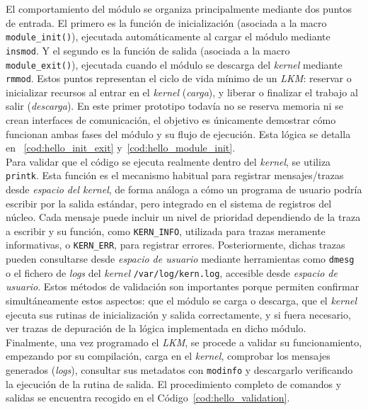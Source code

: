 El comportamiento del módulo se organiza principalmente mediante dos puntos de entrada.
El primero es la función de inicialización (asociada a la macro \texttt{module\_init()}), ejecutada automáticamente al cargar el módulo mediante \texttt{insmod}.
Y el segundo es la función de salida (asociada a la macro \texttt{module\_exit()}), ejecutada cuando el módulo se descarga del \textit{kernel} mediante \texttt{rmmod}.
Estos puntos representan el ciclo de vida mínimo de un \textit{LKM}: reservar o inicializar recursos al entrar en el \textit{kernel} (\textit{carga}), y liberar o finalizar el trabajo al salir (\textit{descarga}).
En este primer prototipo todavía no se reserva memoria ni se crean interfaces de comunicación, el objetivo es únicamente demostrar cómo funcionan ambas fases del módulo y su flujo de ejecución.
Esta lógica se detalla en ~\ref{cod:hello_init_exit} y~\ref{cod:hello_module_init}.\\

Para validar que el código se ejecuta realmente dentro del \textit{kernel}, se utiliza \texttt{printk}.
Esta función es el mecanismo habitual para registrar mensajes/trazas desde \textit{espacio del kernel}, de forma análoga a cómo un programa de usuario podría escribir por la salida estándar, pero integrado en el sistema de registros del núcleo.
Cada mensaje puede incluir un nivel de prioridad dependiendo de la traza a escribir y su función, como \texttt{KERN\_INFO}, utilizada para trazas meramente informativas, o \texttt{KERN\_ERR}, para registrar errores.
Posteriormente, dichas trazas pueden consultarse desde \textit{espacio de usuario} mediante herramientas como \texttt{dmesg} o el fichero de \textit{logs} del \textit{kernel} \texttt{/var/log/kern.log}, accesible desde \textit{espacio de usuario}.
Estos métodos de validación son importantes porque permiten confirmar simultáneamente estos aspectos: que el módulo se carga o descarga, que el \textit{kernel} ejecuta sus rutinas de inicialización y salida correctamente, y si fuera necesario, ver trazas de depuración de la lógica implementada en dicho módulo.\\

Finalmente, una vez programado el \textit{LKM}, se procede a validar su funcionamiento, empezando por su compilación, carga en el \textit{kernel}, comprobar los mensajes generados (\textit{logs}), consultar sus metadatos con \texttt{modinfo} y descargarlo verificando la ejecución de la rutina de salida.
El procedimiento completo de comandos y salidas se encuentra recogido en el Código~\ref{cod:hello_validation}.\\

